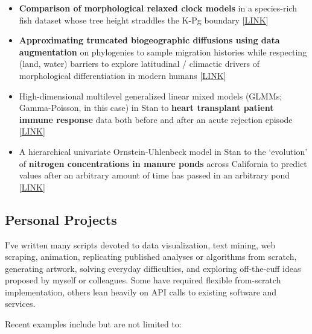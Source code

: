 \documentclass[12pt]{article}
\begin{document}
\begin{itemize}[noitemsep]

\item \textbf{Comparison of morphological relaxed clock models} in a species-rich fish dataset whose tree height straddles the K-Pg boundary [\href{https://github.com/NikVetr/dissertation_work/blob/961baf0f64fe6139dc2c1723d37dcd4d51cbd16a/rateHeterogeneity\_DisparityThroughTime.R}{LINK}]
\item \textbf{Approximating truncated biogeographic diffusions using data augmentation} on phylogenies to sample migration histories while respecting (land, water) barriers to explore latitudinal / climactic drivers of morphological differentiation in modern humans [\href{https://github.com/NikVetr/dissertation\_work/blob/961baf0f64fe6139dc2c1723d37dcd4d51cbd16a/truncatedBMapprox.R}{LINK}]
\item High-dimensional multilevel generalized linear mixed models (GLMMs; Gamma-Poisson, in this case) in Stan to \textbf{heart transplant patient immune response} data both before and after an acute rejection episode [\href{https://github.com/NikVetr/side\_projects/blob/master/multilevelPoisson.R}{LINK}]
\item A hierarchical univariate Ornstein-Uhlenbeck model in Stan to the `evolution' of \textbf{nitrogen concentrations in manure ponds} across California to predict values after an arbitrary amount of time has passed in an arbitrary pond [\href{https://github.com/NikVetr/side_projects/blob/24f7e38876a95433364123441f9b41d260105be6/OUmodel\_manurePonds.R}{LINK}]

\end{itemize}

%

\subsection{Personal Projects}
I've written many scripts devoted to data visualization, text mining, web scraping, animation, replicating published analyses or algorithms from scratch, generating artwork, solving everyday difficulties, and exploring off-the-cuff ideas proposed by myself or colleagues. Some have required flexible from-scratch implementation, others lean heavily on API calls to existing software and services.

Recent examples include but are not limited to:
\end{document}
